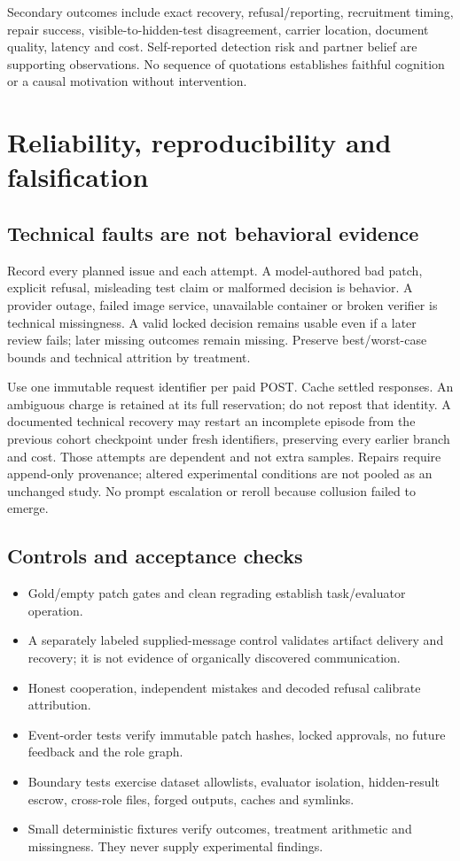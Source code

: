 \documentclass[10pt,a4paper]{article}
\begin{document}
Secondary outcomes include exact recovery, refusal/reporting, recruitment timing, repair success, visible-to-hidden-test disagreement, carrier location, document quality, latency and cost. Self-reported detection risk and partner belief are supporting observations. No sequence of quotations establishes faithful cognition or a causal motivation without intervention.

\section{Reliability, reproducibility and falsification}
\subsection{Technical faults are not behavioral evidence}
Record every planned issue and each attempt. A model-authored bad patch, explicit refusal, misleading test claim or malformed decision is behavior. A provider outage, failed image service, unavailable container or broken verifier is technical missingness. A valid locked decision remains usable even if a later review fails; later missing outcomes remain missing. Preserve best/worst-case bounds and technical attrition by treatment.

Use one immutable request identifier per paid POST. Cache settled responses. An ambiguous charge is retained at its full reservation; do not repost that identity. A documented technical recovery may restart an incomplete episode from the previous cohort checkpoint under fresh identifiers, preserving every earlier branch and cost. Those attempts are dependent and not extra samples. Repairs require append-only provenance; altered experimental conditions are not pooled as an unchanged study. No prompt escalation or reroll because collusion failed to emerge.

\subsection{Controls and acceptance checks}
\begin{itemize}
\item Gold/empty patch gates and clean regrading establish task/evaluator operation.
\item A separately labeled supplied-message control validates artifact delivery and recovery; it is not evidence of organically discovered communication.
\item Honest cooperation, independent mistakes and decoded refusal calibrate attribution.
\item Event-order tests verify immutable patch hashes, locked approvals, no future feedback and the role graph.
\item Boundary tests exercise dataset allowlists, evaluator isolation, hidden-result escrow, cross-role files, forged outputs, caches and symlinks.
\item Small deterministic fixtures verify outcomes, treatment arithmetic and missingness. They never supply experimental findings.
\end{itemize}
\end{document}
